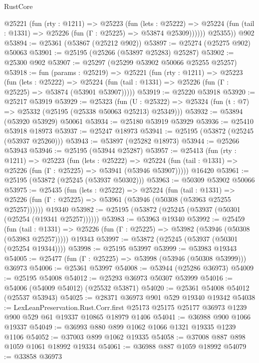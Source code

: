 \begin{lexlean}{RustCore}
\begin{coremodule}
          @25221
            (fun (rty : @1211) =>
            @25223
              (fun (lets : @25222) =>
              @25224 (fun (tail : @1331) => @25226 (fun (Γ : @25225) => @53874 @25309))))))
        @25355))
    @902
@53894 := @25361 (@53867 (@25212 @902))
@53897 := @25274 (@25275 @902) @50063
@53901 := @25195 (@25266 (@53897 @25283) @25287)
@53902 := @25300 @902
@53907 := @25297 (@25299 @53902 @50066 @25255 @25257)
@53918 := fun (params : @25219) =>
  @25221
    (fun (rty : @1211) =>
    @25223
      (fun (lets : @25222) =>
      @25224 (fun (tail : @1331) => @25226 (fun (Γ : @25225) => @53874 (@53901 @53907)))))
@53919 := @25220 @53918
@53920 := @25217 @53919
@53929 := @25323
    (fun (U : @25322) => @25324 (fun (t : @7) => @25332 (@25195 (@25338 @50063 @25213) @25349)))
@53932 := @53894 (@53920 @53929) @50061
@53934 := @25180 @53919 @53929
@53936 := @25410 @53918 @18973
@53937 := @25247 @18973
@53941 := @25195 (@53872 (@25245 (@53937 @25260)))
@53943 := @53897 (@25282 @18973)
@53944 := @25266 @53943
@53946 := @25195 (@53944 @25287)
@53957 := @25413
    (fun (rty : @1211) =>
    @25223
      (fun (lets : @25222) =>
      @25224 (fun (tail : @1331) => @25226 (fun (Γ : @25225) => @53941 (@53946 @53907)))))
    @16420
@53961 := @25195 (@53872 (@25245 (@53937 @50302)))
@53963 := @50309 @53902 @50066
@53975 := @25435
    (fun (lets : @25222) =>
    @25224
      (fun (tail : @1331) =>
      @25226 (fun (Γ : @25225) => @53961 (@53946 (@50308 (@53963 @25255 @25257))))))
    @19340
@53982 := @25195 (@53872 (@25245 (@53937 (@50301 (@25254 (@19341 @25257))))))
@53983 := @53963 @19340
@53992 := @25459
    (fun (tail : @1331) => @25226 (fun (Γ : @25225) => @53982 (@53946 (@50308 (@53983 @25257)))))
    @19343
@53997 := @53872 (@25245 (@53937 (@50301 (@25254 @19344))))
@53998 := @25195 @53997
@53999 := @53983 @19343
@54005 := @25477 (fun (Γ : @25225) => @53998 (@53946 (@50308 @53999))) @36973
@54006 := @25361 @53997
@54008 := @53944 (@25286 @36973)
@54009 := @25195 @54008
@54012 := @25293 @36973 @50307 @53999
@54016 := @54006 (@54009 @54012) (@25532 @53871)
@54020 := @25361 @54008 @54012 (@25537 @53943)
@54025 := @28371 @36973 @901 @529 @19340 @19342
@54038 := LexLeanPreservation.Rust.Corr.first
    @25173
    @25175
    @25177
    @36973
    @1239
    @900
    @529
    @61
    @19337
    @10865
    @18979
    @1406
@54041 := @36988 @900 @1066 @19337
@54049 := @36993 @880 @899 @1062 @1066 @1321 @19335 @1239 @1106
@54052 := @37003 @899 @1062 @19335
@54058 := @37008 @887 @898 @1059 @1061 @18992 @19334
@54061 := @36988 @887 @1059 @18992
@54079 := @33858
    @36973

\end{coremodule}
\end{lexlean}
